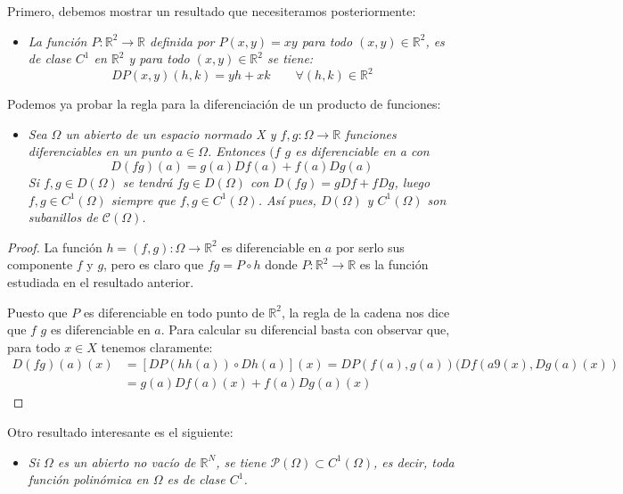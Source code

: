 \documentclass[a4paper, 12pt]{article}
\begin{document}
\begin{enumerate}[label=\textbf{\arabic*}.]
\begin{enumerate}[label=\textit{\alph*})]
		Primero, debemos mostrar un resultado que necesiteramos posteriormente:
		\begin{itemize}
			\item \textit{La función \(P: \mathbb{R}^2 \to \mathbb{R}\) definida por \(P(x,y) =xy\) para todo \((x,y) \in \mathbb{R}^2\), es de clase \(C^1\) en \(\mathbb{R}^2\) y para todo \((x,y) \in \mathbb{R}^2\) se tiene:}
			\[
				DP(x,y)(h,k) = yh + xk \qquad \forall (h,k) \in \mathbb{R}^2
			\]
		\end{itemize}
		
		Podemos ya probar la regla para la diferenciación de un producto de funciones:
		
		\begin{itemize}
			\item \textit{Sea \(\Omega\) un abierto de un espacio normado X y \(f,g : \Omega \to \mathbb{R}\) funciones diferenciables en un punto \(a \in \Omega\). Entonces \((f\) \(g\) es diferenciable en a con}
			\begin{equation}\label{producto}
				D(fg)(a) = g(a) Df(a) + f(a) Dg(a)
			\end{equation}
			\textit{Si \(f,g \in D(\Omega)\) se tendrá \(fg \in D(\Omega)\) con \(D(fg) = gDf + fDg\), luego \(f,g \in C^1 (\Omega)\) siempre que \(f,g \in C^1(\Omega)\). Así pues, \(D(\Omega)\) y \(C^1(\Omega)\) son subanillos de \(\mathcal{C}(\Omega)\).}
		\end{itemize}
		
		\begin{proof}
		La función \(h = (f,g): \Omega \to \mathbb{R}^2\) es diferenciable en \(a\) por serlo sus componente \(f\) y \(g\), pero es claro que \(fg = P \circ h\) donde \(P: \mathbb{R}^2 \to \mathbb{R}\) es la función estudiada en el resultado anterior.
		
		Puesto que \(P\) es diferenciable en todo punto de \(\mathbb{R}^2\), la regla de la cadena nos dice que \(f\) \(g\) es diferenciable en \(a\). Para calcular su diferencial basta con observar que, para todo \(x \in X\) tenemos claramente:
		\[
		\begin{array}{ll}
			D(fg)(a)(x)  & = [DP(hh(a)) \circ Dh(a)](x) = DP(f(a),g(a)) (Df(a9(x),Dg(a)(x)) \\ 
			& = g(a) Df(a)(x) + f(a) Dg(a)(x)
		\end{array}
		\]
		\end{proof}
		
		Otro resultado interesante es el siguiente:
		\begin{itemize}
			\item \textit{Si \(\Omega\) es un abierto no vacío de \(\mathbb{R}^N\), se tiene \(\mathcal{P}(\Omega) \subset C^1(\Omega)\), es decir, toda función polinómica en \(\Omega\) es de clase \(C^1\).}
		\end{itemize}
		

\end{enumerate}
\end{enumerate}
\end{document}
